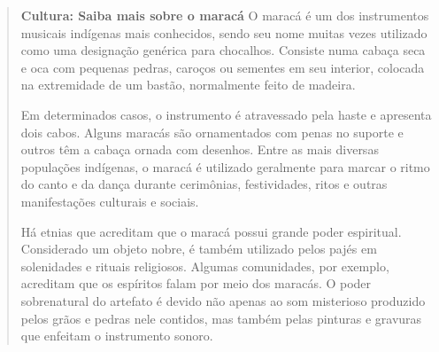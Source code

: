 \begin{minipage}{.5\textwidth}
\begin{quote}
\textbf{Cultura: Saiba mais sobre o maracá}
O maracá é um dos instrumentos musicais indígenas mais conhecidos, sendo
seu nome muitas vezes utilizado como uma designação genérica para
chocalhos. Consiste numa cabaça seca e oca com pequenas pedras, caroços
ou sementes em seu interior, colocada na extremidade de um bastão,
normalmente feito de madeira.

Em determinados casos, o instrumento é atravessado pela haste e
apresenta dois cabos. Alguns maracás são ornamentados com penas no
suporte e outros têm a cabaça ornada com desenhos. Entre as mais
diversas populações indígenas, o maracá é utilizado geralmente para
marcar o ritmo do canto e da dança durante cerimônias, festividades,
ritos e outras manifestações culturais e sociais.

Há etnias que acreditam que o maracá possui grande poder espiritual. Considerado um objeto nobre, é também utilizado pelos pajés em solenidades e rituais religiosos. Algumas comunidades, por exemplo, acreditam que os espíritos falam por meio dos maracás. O poder sobrenatural do artefato é devido não apenas ao som misterioso produzido pelos grãos e pedras nele contidos, mas também pelas pinturas e gravuras que enfeitam o instrumento sonoro.

\end{quote}
\end{minipage}\hspace{.5cm}
